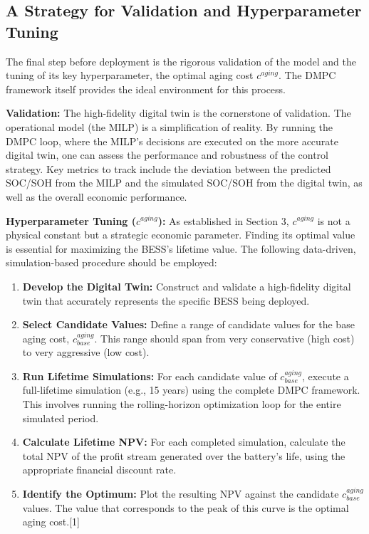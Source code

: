 \subsection{A Strategy for Validation and Hyperparameter Tuning}

The final step before deployment is the rigorous validation of the model and the tuning of its key hyperparameter, the optimal aging cost $c^{aging}$. The DMPC framework itself provides the ideal environment for this process.

\textbf{Validation:} The high-fidelity digital twin is the cornerstone of validation. The operational model (the MILP) is a simplification of reality. By running the DMPC loop, where the MILP's decisions are executed on the more accurate digital twin, one can assess the performance and robustness of the control strategy. Key metrics to track include the deviation between the predicted SOC/SOH from the MILP and the simulated SOC/SOH from the digital twin, as well as the overall economic performance.

\textbf{Hyperparameter Tuning ($c^{aging}$):} As established in Section 3, $c^{aging}$ is not a physical constant but a strategic economic parameter. Finding its optimal value is essential for maximizing the BESS's lifetime value. The following data-driven, simulation-based procedure should be employed:
\begin{enumerate}
    \item \textbf{Develop the Digital Twin:} Construct and validate a high-fidelity digital twin that accurately represents the specific BESS being deployed.
    \item \textbf{Select Candidate Values:} Define a range of candidate values for the base aging cost, $c^{aging}_{base}$. This range should span from very conservative (high cost) to very aggressive (low cost).
    \item \textbf{Run Lifetime Simulations:} For each candidate value of $c^{aging}_{base}$, execute a full-lifetime simulation (e.g., 15 years) using the complete DMPC framework. This involves running the rolling-horizon optimization loop for the entire simulated period.
    \item \textbf{Calculate Lifetime NPV:} For each completed simulation, calculate the total NPV of the profit stream generated over the battery's life, using the appropriate financial discount rate.
    \item \textbf{Identify the Optimum:} Plot the resulting NPV against the candidate $c^{aging}_{base}$ values. The value that corresponds to the peak of this curve is the optimal aging cost.[1]
\end{enumerate}

